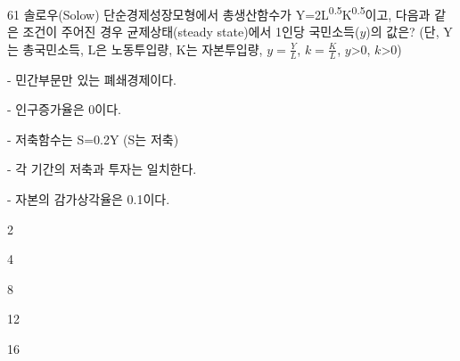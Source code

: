 \begin{question}{61}
솔로우(Solow) 단순경제성장모형에서 총생산함수가 Y=2L\textsuperscript{0.5}K\textsuperscript{0.5}이고, 다음과 같은 조건이 주어진 경우 균제상태(steady state)에서 1인당 국민소득($y$)의 값은? (단, Y는 총국민소득, L은 노동투입량, K는 자본투입량, $y= \frac{ Y } { L }$, $k= \frac{ K } { L }$, $y$>0, $k$>0)
\begin{framedtext}
- 민간부문만 있는 폐쇄경제이다. \par
- 인구증가율은 0이다. \par
- 저축함수는 S=0.2Y (S는 저축) \par
- 각 기간의 저축과 투자는 일치한다. \par
- 자본의 감가상각율은 0.1이다.
\end{framedtext}
\begin{choices}
  \item 2
  \item 4
  \item 8
  \item 12
  \item 16
\end{choices}
\end{question}
